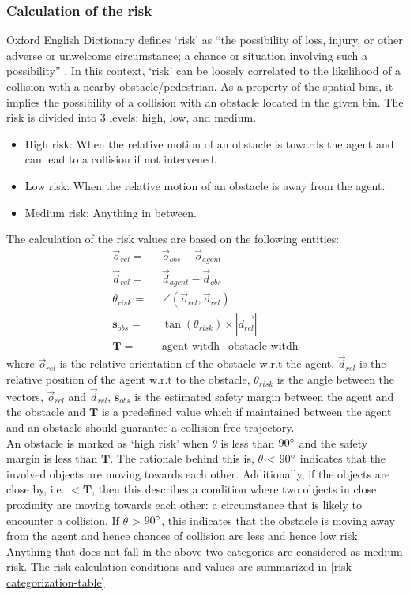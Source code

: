 \subsubsection*{Calculation of the risk}
Oxford English Dictionary defines `risk' as ``the possibility of loss, injury, or other adverse or unwelcome circumstance; a chance or situation involving such a possibility'' \cite{oxford_dictionary}. In this context, `risk' can be loosely correlated to the likelihood of a collision with a nearby obstacle/pedestrian. As a property of the spatial bins, it implies the possibility of a collision with an obstacle located in the given bin. 
The risk is divided into 3 levels: high, low, and medium.
\begin{itemize}
    \item High risk:
When the relative motion of an obstacle is towards the agent and can lead to a collision if not intervened.
    \item Low risk:
When the relative motion of an obstacle is away from the agent.
    \item Medium risk:
Anything in between.
\end{itemize}
The calculation of the risk values are based on the following entities:
\begin{align}
    \vec{o}_{rel} = & \;\; \vec{o}_{obs} - \vec{o}_{agent}  \\
    \vec{d}_{rel} =  &\;\; \vec{d}_{agent} - \vec{d}_{obs} \\
    \theta_{risk} =  & \;\; \angle (\vec{o}_{rel}, \vec{o}_{rel}) \\
    \mathbf{s}_{obs} = & \;\; \tan(\theta_{risk}) \times |\vec{d_{rel}}| \\
    \mathbf{T} = & \;\; \text{agent witdh} + \text{obstacle witdh}
\end{align}
where $\vec{o}_{rel}$ is the relative orientation of the obstacle w.r.t the agent, $\vec{d}_{rel}$ is the relative position of the agent w.r.t to the obstacle, $\theta_{risk}$ is the angle between the vectors, $\vec{o}_{rel}$ and $\vec{d}_{rel}$,  $\mathbf{s}_{obs}$ is the estimated safety margin between the agent and the obstacle and $\mathbf{T}$ is a predefined value which if maintained between the agent and an obstacle should guarantee a collision-free trajectory.\\
An obstacle is marked as `high risk' when $\theta$ is less than $90\degree$ and the safety margin is less than $\mathbf{T}$. The rationale behind this is,  $\theta$ < $90 \degree$ indicates that the involved objects are moving towards each other. Additionally, if the objects are close by, i.e. $ < \mathbf{T}$, then this describes a condition where two objects in close proximity are moving towards each other: a circumstance that is likely to encounter a collision.  If $\theta$ > $90 \degree$, this indicates that the obstacle is moving away from the agent and hence chances of collision are less and hence low risk. Anything that does not fall in the above two categories are considered as medium risk. The risk calculation conditions and values are summarized in \autoref{risk-categorization-table}
